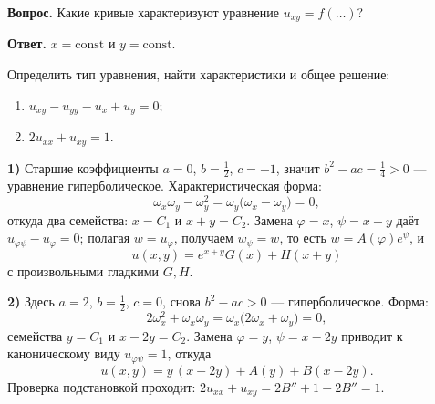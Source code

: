 \begin{center}
\textbf{Вопрос.} Какие кривые характеризуют уравнение $u_{xy} = f(\dots)$?
\end{center}

\begin{center}
\textbf{Ответ.} $x = \mathrm{const}$ и $y = \mathrm{const}$.
\end{center}

\begin{exercise}
Определить тип уравнения, найти характеристики и общее решение:
\begin{enumerate}[label=\arabic*), leftmargin=2em]
  \item $u_{xy} - u_{yy} - u_x + u_y = 0$;
  \item $2u_{xx} + u_{xy} = 1$.
\end{enumerate}
\end{exercise}

\begin{idea}[title={Разбор упражнения (на лекции не было)}]
\textbf{1)} Старшие коэффициенты $a = 0$, $b = \tfrac12$, $c = -1$, значит
$b^2 - ac = \tfrac14 > 0$ — уравнение гиперболическое. Характеристическая
форма:
\[
  \omega_x\omega_y - \omega_y^2 = \omega_y\big(\omega_x - \omega_y\big) = 0 ,
\]
откуда два семейства: $x = C_1$ и $x + y = C_2$. Замена $\varphi = x$,
$\psi = x+y$ даёт $u_{\varphi\psi} - u_\varphi = 0$; полагая $w = u_\varphi$,
получаем $w_\psi = w$, то есть $w = A(\varphi)e^{\psi}$, и
\[
  u(x,y) = e^{x+y} G(x) + H(x+y)
\]
с произвольными гладкими $G, H$.

\medskip
\textbf{2)} Здесь $a = 2$, $b = \tfrac12$, $c = 0$, снова $b^2 - ac > 0$ —
гиперболическое. Форма:
\[
  2\omega_x^2 + \omega_x\omega_y = \omega_x\big(2\omega_x + \omega_y\big) = 0 ,
\]
семейства $y = C_1$ и $x - 2y = C_2$. Замена $\varphi = y$, $\psi = x - 2y$
приводит к каноническому виду $u_{\varphi\psi} = 1$, откуда
\[
  u(x,y) = y\,(x - 2y) + A(y) + B(x - 2y) .
\]
Проверка подстановкой проходит: $2u_{xx} + u_{xy} = 2B'' + 1 - 2B'' = 1$.
\end{idea}
